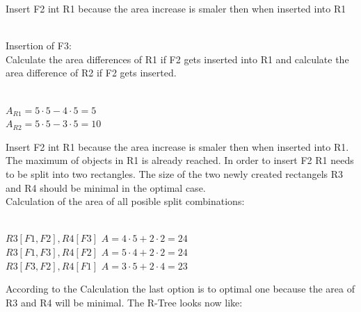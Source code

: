 \begin{enumerate}
  Insert F2 int R1 because the area increase is smaler then when inserted into R1\\\\
  \begin{center}
  \end{center}
  Insertion of F3:\\
  Calculate the area differences of R1 if F2 gets inserted into R1 and calculate the area difference of R2 if F2 gets inserted.\\\\
  \begin{center}
    $A_{R1} = 5 \cdot 5 - 4 \cdot 5 = 5$\\
    $A_{R2} = 5 \cdot 5 - 3 \cdot 5 = 10$
  \end{center}
  Insert F2 int R1 because the area increase is smaler then when inserted into R1. The maximum of objects in R1 is already reached. 
  In order to insert F2 R1 needs to be split into two rectangles. The size of the two newly created rectangels R3 and R4 should be minimal in the optimal case.\\
  Calculation of the area of all posible split combinations:\\\\
  \begin{center}
    $R3[F1, F2], R4[F3]$ $A = 4 \cdot 5 + 2 \cdot 2 = 24$\\
    $R3[F1, F3], R4[F2]$ $A = 5 \cdot 4 + 2 \cdot 2 = 24$\\
    $R3[F3, F2], R4[F1]$ $A = 3 \cdot 5 + 2 \cdot 4 = 23$
  \end{center}
    
    According to the Calculation the last option is to optimal one because the area of R3 and R4 will be minimal. The R-Tree looks now like:\\\\
    \begin{center}
    \end{center}
    

\end{enumerate}
